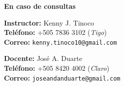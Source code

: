 \vspace*{\fill}
\begin{flushright}
    \textbf{\large En caso de consultas}

    \textbf{Instructor:} Kenny J. Tinoco \\
    \textbf{Teléfono:} +505 7836 3102 (\emph{Tigo}) \\
    \textbf{Correo:} \texttt{kenny.tinoco10@gmail.com}

    \textbf{Docente:} José A. Duarte\\
    \textbf{Teléfono:} +505 8420 4002 (\emph{Claro})\\
    \textbf{Correo:} \texttt{joseandanduarte@gmail.com}

\end{flushright}
\vspace*{0cm}